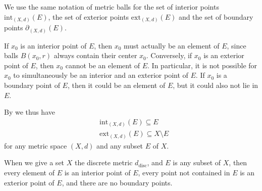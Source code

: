 \begin{note}
  We use the same notation of metric balls for the set of interior points \(\text{int}_{(X, d)}(E)\), the set of exterior points \(\text{ext}_{(X, d)}(E)\) and the set of boundary points \(\partial_{(X, d)}(E)\).
\end{note}

\begin{rmk}\label{ii:1.2.6}
  If \(x_0\) is an interior point of \(E\), then \(x_0\) must actually be an element of \(E\), since balls \(B(x_0, r)\) always contain their center \(x_0\).
  Conversely, if \(x_0\) is an exterior point of \(E\), then \(x_0\) cannot be an element of \(E\).
  In particular, it is not possible for \(x_0\) to simultaneously be an interior and an exterior point of \(E\).
  If \(x_0\) is a boundary point of \(E\), then it could be an element of \(E\), but it could also not lie in \(E\).
\end{rmk}

\begin{note}
  By  we thus have
  \begin{align*}
     & \text{int}_{(X, d)}(E) \subseteq E             \\
     & \text{ext}_{(X, d)}(E) \subseteq X \setminus E
  \end{align*}
  for any metric space \((X, d)\) and any subset \(E\) of \(X\).
\end{note}

\setcounter{thm}{7}
\begin{eg}\label{ii:1.2.8}
  When we give a set \(X\) the discrete metric \(d_{\text{disc}}\), and \(E\) is any subset of \(X\), then every element of \(E\) is an interior point of \(E\), every point not contained in \(E\) is an exterior point of \(E\), and there are no boundary points.
\end{eg}

